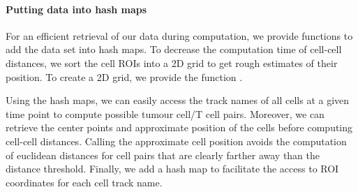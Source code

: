 \documentclass{report}
\begin{document}
%	
%		
%	
%	
%	
%	
%	
%	

\paragraph{Putting data into hash maps} 
For an efficient retrieval of our data during computation, we provide functions to add the data set into hash maps. To decrease the computation time of cell-cell distances, we sort the cell ROIs into a 2D grid to get rough estimates of their position. To create a 2D grid, we provide the function . 


Using the hash maps, we can easily access the track names of all cells at a given time point to compute possible tumour cell/T cell pairs. Moreover, we can retrieve the center points and approximate position of the cells before computing cell-cell distances. Calling the approximate cell position avoids the computation of euclidean distances for cell pairs that are clearly farther away than the distance threshold. Finally, we add a hash map to facilitate the access to ROI coordinates for each cell track name. 
\end{document}
